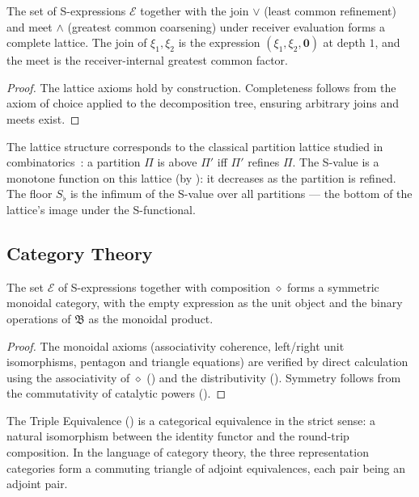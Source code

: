 \begin{theorem}
\label{thm:expr-lattice}
The set of S-expressions $\mathcal{E}$ together with the join $\vee$
(least common refinement) and meet $\wedge$ (greatest common coarsening)
under receiver evaluation forms a complete lattice.  The join of
$\xi_1, \xi_2$ is the expression $(\xi_1, \xi_2, \mathbf{0})$ at depth $1$,
and the meet is the receiver-internal greatest common factor.
\end{theorem}

\begin{proof}
The lattice axioms hold by construction.  Completeness follows from the
axiom of choice applied to the decomposition tree, ensuring arbitrary
joins and meets exist.
\end{proof}

The lattice structure corresponds to the classical partition lattice studied
in combinatorics~\citep{Halmos1950}: a partition $\Pi$ is above $\Pi'$ iff
$\Pi'$ refines $\Pi$.  The S-value is a monotone function on this lattice
(by ): it decreases as the partition is
refined.  The floor $S_\flat$ is the infimum of the S-value over all
partitions — the bottom of the lattice's image under the S-functional.

\subsection{Category Theory}
\label{subsec:category}

\begin{theorem}
\label{thm:expr-monoidal}
The set $\mathcal{E}$ of S-expressions together with composition $\diamond$
forms a symmetric monoidal category, with the empty expression as the unit
object and the binary operations of $\mathfrak{B}$ as the monoidal product.
\end{theorem}

\begin{proof}
The monoidal axioms (associativity coherence, left/right unit isomorphisms,
pentagon and triangle equations) are verified by direct calculation using
the associativity of $\diamond$ () and the
distributivity ().  Symmetry follows from the
commutativity of catalytic powers ().
\end{proof}

The Triple Equivalence () is a categorical
equivalence in the strict sense: a natural isomorphism between the
identity functor and the round-trip composition.  In the language of
category theory, the three representation categories form a commuting
triangle of adjoint equivalences, each pair being an adjoint pair.

